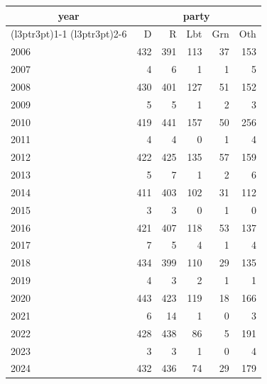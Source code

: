 \footnotesize\begin{tabular}[t]{lrrrrr}
\toprule
\multicolumn{1}{c}{year} & \multicolumn{5}{c}{party} \\
\cmidrule(l{3pt}r{3pt}){1-1} \cmidrule(l{3pt}r{3pt}){2-6}
  & D & R & Lbt & Grn & Oth\\
\midrule
2006 & 432 & 391 & 113 & 37 & 153\\
2007 & 4 & 6 & 1 & 1 & 5\\
2008 & 430 & 401 & 127 & 51 & 152\\
2009 & 5 & 5 & 1 & 2 & 3\\
2010 & 419 & 441 & 157 & 50 & 256\\
2011 & 4 & 4 & 0 & 1 & 4\\
2012 & 422 & 425 & 135 & 57 & 159\\
2013 & 5 & 7 & 1 & 2 & 6\\
2014 & 411 & 403 & 102 & 31 & 112\\
2015 & 3 & 3 & 0 & 1 & 0\\
2016 & 421 & 407 & 118 & 53 & 137\\
2017 & 7 & 5 & 4 & 1 & 4\\
2018 & 434 & 399 & 110 & 29 & 135\\
2019 & 4 & 3 & 2 & 1 & 1\\
2020 & 443 & 423 & 119 & 18 & 166\\
2021 & 6 & 14 & 1 & 0 & 3\\
2022 & 428 & 438 & 86 & 5 & 191\\
2023 & 3 & 3 & 1 & 0 & 4\\
2024 & 432 & 436 & 74 & 29 & 179\\
\bottomrule
\end{tabular}
